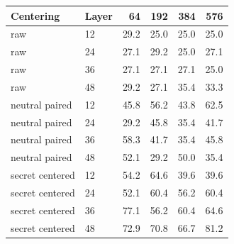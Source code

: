 \begin{tabular}{llrrrr}
\toprule
Centering & Layer & 64 & 192 & 384 & 576 \\
\midrule
raw & 12 & 29.2 & 25.0 & 25.0 & 25.0 \\
raw & 24 & 27.1 & 29.2 & 25.0 & 27.1 \\
raw & 36 & 27.1 & 27.1 & 27.1 & 25.0 \\
raw & 48 & 29.2 & 27.1 & 35.4 & 33.3 \\
neutral paired & 12 & 45.8 & 56.2 & 43.8 & 62.5 \\
neutral paired & 24 & 29.2 & 45.8 & 35.4 & 41.7 \\
neutral paired & 36 & 58.3 & 41.7 & 35.4 & 45.8 \\
neutral paired & 48 & 52.1 & 29.2 & 50.0 & 35.4 \\
secret centered & 12 & 54.2 & 64.6 & 39.6 & 39.6 \\
secret centered & 24 & 52.1 & 60.4 & 56.2 & 60.4 \\
secret centered & 36 & 77.1 & 56.2 & 60.4 & 64.6 \\
secret centered & 48 & 72.9 & 70.8 & 66.7 & 81.2 \\
\bottomrule
\end{tabular}